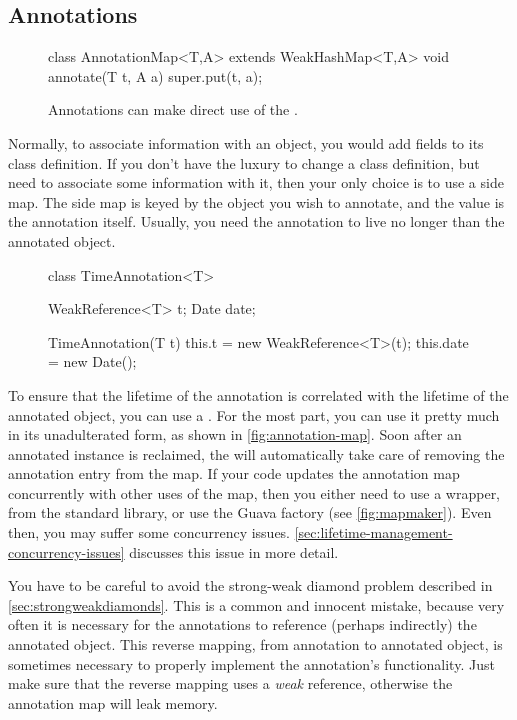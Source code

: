 \subsection{Annotations}

\begin{figure}
\centering
\vspace{-3mm}
\begin{framedlisting}
class AnnotationMap<T,A> extends WeakHashMap<T,A> {
  void annotate(T t, A a) {
    super.put(t, a);
  }
}
\end{framedlisting}
\caption{Annotations can make direct use of the .}
\label{fig:annotation-map}
\end{figure}
Normally, to associate information with an object, you would add fields to its
class definition. If you don't have the luxury to change a class definition, but
need to associate some information with it, then your only choice is to use a
side map. The side map is keyed by the object you wish to annotate, and the
value is the annotation itself. Usually, you need the annotation to live no
longer than the annotated object. 

\begin{figure}
\centering
\begin{framedlisting}
class TimeAnnotation<T> {
  WeakReference<T> t;
  Date date;
  
  TimeAnnotation(T t) {
    this.t = new WeakReference<T>(t);
    this.date = new Date();
  }
}
\end{framedlisting}
\end{figure}
To ensure that the lifetime of the annotation is correlated with the lifetime of
the annotated object, you can use a . For the most part, you
can use it pretty much in its unadulterated form, as shown in
\autoref{fig:annotation-map}. Soon after an annotated  instance is
reclaimed, the  will automatically take care of removing the
annotation entry from the map. If your code updates the annotation map
concurrently with other uses of the map, then you either need to use a
 wrapper, from the standard library, or use
the Guava  factory (see \autoref{fig:mapmaker}). Even then, you
may suffer some concurrency issues.
\autoref{sec:lifetime-management-concurrency-issues} discusses this issue in
more detail.

You have to be careful to avoid the strong-weak diamond problem described
in \autoref{sec:strongweakdiamonds}.  This is a common and innocent mistake,
because very often it is necessary for the annotations to reference (perhaps
indirectly) the annotated object. This reverse mapping, from annotation to
annotated object, is sometimes necessary to properly implement the annotation's
functionality. Just make sure that the reverse mapping uses a \emph{weak}
reference, otherwise the annotation map will leak memory.

